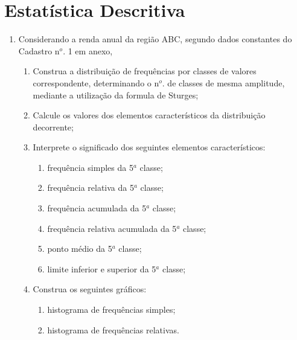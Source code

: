 \chapter{Estatística Descritiva}

\begin{enumerate}

\item Considerando a renda anual da região ABC, segundo dados constantes do Cadastro n$^o$. 1 em anexo,
	\begin{enumerate}
	\item Construa a distribuição de frequências por classes de valores correspondente, determinando o n$^o$. de classes de mesma amplitude, mediante a utilização da formula de Sturges;
	\item Calcule os valores dos elementos característicos da distribuição decorrente;
	\item Interprete o significado dos seguintes elementos característicos:
		\begin{enumerate}
		\item frequência simples da 5$^a$ classe;
		\item frequência relativa da 5$^a$ classe;
		\item frequência acumulada da 5$^a$ classe;
		\item frequência relativa acumulada da 5$^a$ classe;
		\item ponto médio da 5$^a$ classe;
		\item limite inferior e superior da 5$^a$ classe;
		\end{enumerate}
	\item Construa os seguintes gráficos:
		\begin{enumerate}
		\item histograma de frequências simples;
		\item histograma de frequências relativas.
		\end{enumerate}
	\end{enumerate}


\end{enumerate}
